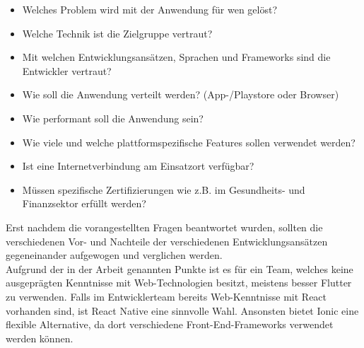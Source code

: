 \begin{multicols}{2}
	\begin{itemize}
		\vspace{-2mm}
		\setlength\itemsep{0mm}
		\item Welches Problem wird mit der Anwendung für wen gelöst?
		\item Welche Technik ist die Zielgruppe vertraut?
		\item Mit welchen Entwicklungsansätzen, Sprachen und Frameworks sind die Entwickler vertraut?
		\item Wie soll die Anwendung verteilt werden? (App-/Playstore oder Browser)
		\item Wie performant soll die Anwendung sein?
		\item Wie viele und welche plattformspezifische Features sollen verwendet werden?
		\item Ist eine Internetverbindung am Einsatzort verfügbar?
		\item Müssen spezifische Zertifizierungen wie z.B. im Gesundheits- und Finanzsektor erfüllt werden?
	\end{itemize}
\end{multicols}

Erst nachdem die vorangestellten Fragen beantwortet wurden, sollten die verschiedenen Vor- und Nachteile der verschiedenen Entwicklungsansätzen gegeneinander aufgewogen und verglichen werden.\\

Aufgrund der in der Arbeit genannten Punkte ist es für ein Team, welches keine ausgeprägten Kenntnisse mit Web-Technologien besitzt, meistens besser Flutter zu verwenden. Falls im Entwicklerteam bereits Web-Kenntnisse mit React vorhanden sind, ist React Native eine sinnvolle Wahl. Ansonsten bietet Ionic eine flexible Alternative, da dort verschiedene Front-End-Frameworks verwendet werden können.

